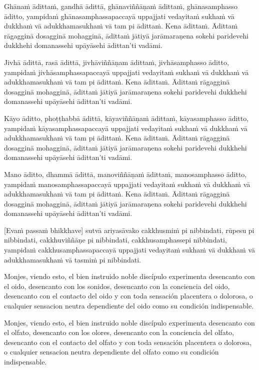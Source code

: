 \clearpage

\paliText
\markboth{\paliTitle}{\rightmark}

Ghānaṁ ādittaṁ, gandhā ādittā, ghānaviññāṇaṁ ādittaṁ, ghānasamphasso
āditto, yampidaṁ ghānasamphassapaccayā uppajjati vedayitaṁ sukhaṁ vā
dukkhaṁ vā adukkhamasukhaṁ vā tam pi ādittaṁ. Kena ādittaṁ. Ādittaṁ
rāgagginā dosagginā mohagginā, ādittaṁ jātiyā jarāmaraṇena sokehi
paridevehi dukkhehi domanassehi upāyāsehi ādittan'ti vadāmi.

Jivhā ādittā, rasā ādittā, jivhāviññāṇam ādittaṁ, jivhāsamphasso āditto,
yampidaṁ jivhāsamphassapaccayā uppajjati vedayitaṁ sukhaṁ vā dukkhaṁ vā
adukkhamasukhaṁ vā tam pi ādittaṁ. Kena ādittaṁ. Ādittaṁ rāgagginā
dosagginā mohagginā, ādittaṁ jātiyā jarāmaraṇena sokehi paridevehi
dukkhehi domanassehi upāyāsehi ādittan'ti vadāmi.

Kāyo āditto, phoṭṭhabbā ādittā, kāyaviññāṇaṁ ādittaṁ, kāyasamphasso
āditto, yampidaṁ kāyasamphassapaccayā uppajjati vedayitaṁ sukhaṁ vā
dukkhaṁ vā adukkhamasukhaṁ vā tam pi ādittaṁ. Kena ādittaṁ. Ādittaṁ
rāgagginā dosagginā mohagginā, ādittaṁ jātiyā jarāmaraṇena sokehi
paridevehi dukkhehi domanassehi upāyāsehi ādittan'ti vadāmi.

Mano āditto, dhammā ādittā, manoviññāṇaṁ ādittaṁ, manosamphasso āditto,
yampidaṁ manosamphassapaccayā uppajjati vedayitaṁ sukhaṁ vā dukkhaṁ vā
adukkhamasukhaṁ vā tam pi ādittaṁ. Kena ādittaṁ. Ādittaṁ rāgagginā
dosagginā mohagginā, ādittaṁ jātiyā jarāmaraṇena sokehi paridevehi
dukkhehi domanassehi upāyāsehi ādittan'ti vadāmi.

\enlargethispage{2\baselineskip}

[Evaṁ passaṁ bhikkhave] sutvā ariyasāvako cakkhusmiṁ pi nibbindati,
rūpesu pi nibbindati, cakkhuviññāṇe pi nibbindati, cakkhusamphassepi
nibbindati, yampidaṁ cakkhusamphassapaccayā uppajjati vedayitaṁ sukhaṁ
vā dukkhaṁ vā adukkhamasukhaṁ vā tasmiṁ pi nibbindati.

\clearpage

\englishText
\markboth{\englishTitle}{\rightmark}

Monjes, viendo esto, el bien instruido noble discípulo experimenta desencanto con el oido, desencanto con los sonidos, desencanto con la conciencia del oido, desencanto con el contacto del oido y con toda sensación placentera o dolorosa, o cualquier sensacion neutra dependiente del oido como su condición indispensable.

Monjes, viendo esto, el bien instruido noble discípulo experimenta desencanto con el olfato, desencanto con los olores, desencanto con la conciencia del olfato, desencanto con el contacto del olfato y con toda sensación placentera o dolorosa, o cualquier sensacion neutra dependiente del olfato como su condición indispensable.

